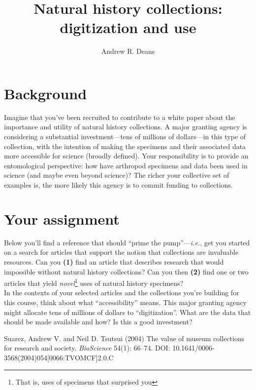 \documentclass[letterpaper, 11pt]{article}
\title{Natural history collections: digitization and use}
\author{Andrew R. Deans}
\begin{document}
\cleanlookdateon %
\maketitle
\thispagestyle{fancy}
\section*{Background}
Imagine that you've been recruited to contribute to a white paper about the importance and utility of natural history collections. A major granting agency is considering a substantial investment---tens of millions of dollars---in this type of collection, with the intention of making the specimens and their associated data more accessible for science (broadly defined). Your responsibility is to provide an entomological perspective: how have arthropod specimens and data been used in science (and maybe even beyond science)? The richer your collective set of examples is, the more likely this agency is to commit funding to collections. 

\section*{Your assignment}
Below you'll find a reference \cite{suarez2004} that should ``prime the pump''---\textit{i.e.}, get you started on a search for articles that support the notion that collections are invaluable resources. Can you \textbf{(1)} find an article that describes research that would impossible without natural history collections? Can you then \textbf{(2)} find one or two articles that yield \textit{novel}\footnote{That is, uses of specimens that surprised you} uses of natural history specimens?\\

In the contexts of your selected articles and the collections you're building for this course, think about what ``accessibility'' means. This major granting agency might allocate tens of millions of dollars to ``digitization''. What are the data that should be made available and how? Is this a good investment?\vspace{2.5cm}



\begin{thebibliography}{9}
 Suarez, Andrew V. and Neil D. Tsutsui (2004) The value of museum collections for research and society. \textit{BioScience} 54(1): 66--74. DOI: 10.1641/0006-3568(2004)054[0066:TVOMCF]2.0.C
\end{thebibliography}
\end{document}
